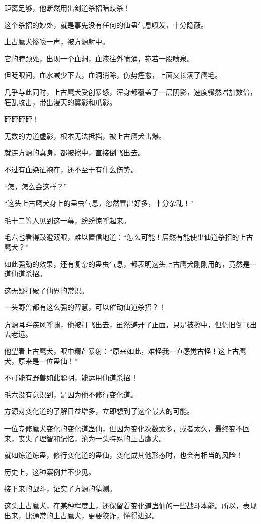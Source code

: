 \begin{this_body}
距离足够，他断然用出剑道杀招暗歧杀！

这个杀招的妙处，就是事先没有任何的仙蛊气息喷发，十分隐蔽。

上古鹰犬惨嚎一声，被方源射中。

它的脖颈处，出现一个血洞，血液往外喷涌，宛若一股喷泉。

但眨眼间，血水减少下去，血洞消除，伤势痊愈，上面又长满了鹰毛。

几乎与此同时，上古鹰犬受创暴怒，浑身都覆盖了一层阴影，速度骤然增加数倍，狂乱攻击，带出漫天的翼影和爪影。

砰砰砰砰！

无数的力道虚影，根本无法抵挡，被上古鹰犬击爆。

就连方源的真身，都被擦中，直接倒飞出去。

不过有血染征袍在，还不至于有什么伤势。

“怎，怎么会这样？”

“这头上古鹰犬身上的蛊虫气息，忽然冒出好多，十分杂乱！”

毛十二等人见到这一幕，纷纷惊呼起来。

毛六也看得鼓瞪双眼，难以置信地道：“怎么可能！居然有能使出仙道杀招的上古鹰犬？”

如此强劲的效果，还有复杂的蛊虫气息，都表明这头上古鹰犬刚刚用的，竟然是一道仙道杀招。

这无疑打破了仙界的常识。

一头野兽都有这么强的智慧，可以催动仙道杀招？！

方源耳畔疾风呼啸，他被打飞出去，虽然避开了正面，只是被擦中，但仍旧倒飞出去老远。

他望着上古鹰犬，眼中精芒暴射：“原来如此，难怪我一直感觉古怪！这上古鹰犬，原来是一位蛊仙！”

不可能有野兽如此聪明，能运用仙道杀招！

毛六没有意识到，是因为他不修行变化道。

方源对变化道的了解日益增多，立即想到了这个最大的可能。

一位专修鹰犬变化的变化道蛊仙，但因为变化次数太多，或者太久，最终变不回来，丧失了理智和记忆，沦为一头特殊的上古鹰犬。

就如炼道炼蛊，修行变化道的蛊仙，变化成其他形态时，也会有相当的风险！

历史上，这种案例并不少见。

接下来的战斗，证实了方源的猜测。

这头上古鹰犬，在某种程度上，还保留着变化道蛊仙的一些战斗本能。所以，表现出来，比通常的上古鹰犬，更要狡诈，懂得进退。


\end{this_body}
